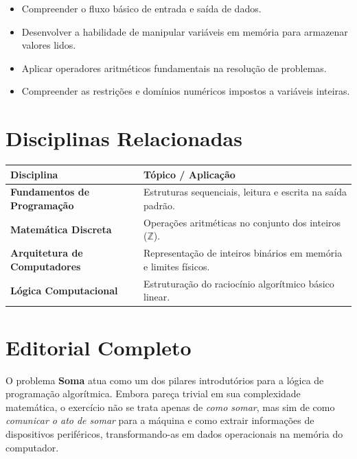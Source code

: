 \documentclass[11pt]{article}
\begin{document}

\begin{objetivobox}
\begin{itemize}
    \item Compreender o fluxo básico de entrada e saída de dados.
    \item Desenvolver a habilidade de manipular variáveis em memória para armazenar valores lidos.
    \item Aplicar operadores aritméticos fundamentais na resolução de problemas.
    \item Compreender as restrições e domínios numéricos impostos a variáveis inteiras.
\end{itemize}
\end{objetivobox}

\section*{Disciplinas Relacionadas}

\begin{table}[h]
\centering
\begin{tabularx}{\textwidth}{>{\bfseries}l X}
\toprule
Disciplina & Tópico / Aplicação \\
\midrule
Fundamentos de Programação & Estruturas sequenciais, leitura e escrita na saída padrão. \\
Matemática Discreta & Operações aritméticas no conjunto dos inteiros ($\mathbb{Z}$). \\
Arquitetura de Computadores & Representação de inteiros binários em memória e limites físicos. \\
Lógica Computacional & Estruturação do raciocínio algorítmico básico linear. \\
\bottomrule
\end{tabularx}
\end{table}


\section*{Editorial Completo}

O problema \textbf{Soma} atua como um dos pilares introdutórios para a lógica de programação algorítmica. Embora pareça trivial em sua complexidade matemática, o exercício não se trata apenas de \textit{como somar}, mas sim de como \textit{comunicar o ato de somar} para a máquina e como extrair informações de dispositivos periféricos, transformando-as em dados operacionais na memória do computador.
\end{document}
